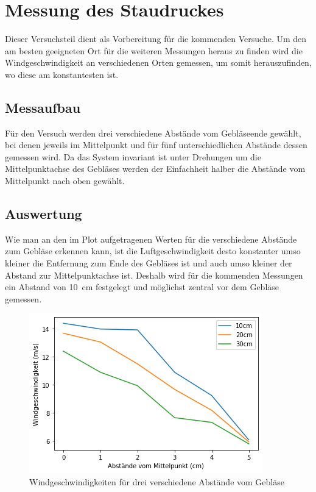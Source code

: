 \section{Messung des Staudruckes}

Dieser Versuchsteil dient als Vorbereitung für die kommenden Versuche. Um den am besten geeigneten Ort für die weiteren Messungen heraus zu finden wird die Windgeschwindigkeit an verschiedenen Orten gemessen, um somit herauszufinden, wo diese am konstantesten ist.

\subsection{Messaufbau}

Für den Versuch werden drei verschiedene Abstände vom Gebläseende gewählt, bei denen jeweils im Mittelpunkt und für fünf unterschiedlichen Abstände dessen gemessen wird. Da das System invariant ist unter Drehungen um die Mittelpunktachse des Gebläses werden der Einfachheit halber die Abstände vom Mittelpunkt nach oben gewählt.

\subsection{Auswertung}

Wie man an den im Plot aufgetragenen Werten für die verschiedene Abstände zum Gebläse erkennen kann, ist die Luftgeschwindigkeit desto konstanter umso kleiner die Entfernung zum Ende des Gebläses ist und auch umso kleiner der Abstand zur Mittelpunktachse ist.
Deshalb wird für die kommenden Messungen ein Abstand von \SI{10}{\centi\metre} festgelegt und möglichst zentral vor dem Gebläse gemessen.

\begin{figure}[h]
    \centering
    \includegraphics[scale=0.8]{Aeromechanik/Protokoll/fig/Aeromechanik Versuch 1.1.png}
    \caption{Windgeschwindigkeiten für drei verschiedene Abstände vom Gebläse}
    \label{fig:Aeromechanik Versuch 1.1}
\end{figure}

